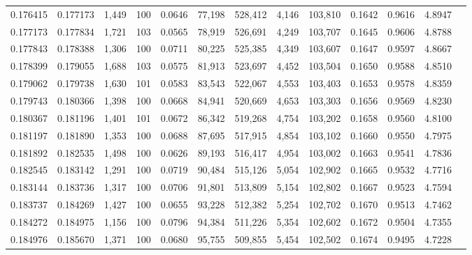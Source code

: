 \begin{tabular}{rrrrrrrrrrrrr}
0.176415 & 0.177173 & 1,449 & 100 &                                     0.0646 &  77,198 & 528,412 &   4,146 & 103,810 & 0.1642 & 0.9616 & 4.8947 \\
0.177173 & 0.177834 & 1,721 & 103 &                                     0.0565 &  78,919 & 526,691 &   4,249 & 103,707 & 0.1645 & 0.9606 & 4.8788 \\
0.177843 & 0.178388 & 1,306 & 100 &                                     0.0711 &  80,225 & 525,385 &   4,349 & 103,607 & 0.1647 & 0.9597 & 4.8667 \\
0.178399 & 0.179055 & 1,688 & 103 &                                     0.0575 &  81,913 & 523,697 &   4,452 & 103,504 & 0.1650 & 0.9588 & 4.8510 \\
0.179062 & 0.179738 & 1,630 & 101 &                                     0.0583 &  83,543 & 522,067 &   4,553 & 103,403 & 0.1653 & 0.9578 & 4.8359 \\
0.179743 & 0.180366 & 1,398 & 100 &                                     0.0668 &  84,941 & 520,669 &   4,653 & 103,303 & 0.1656 & 0.9569 & 4.8230 \\
0.180367 & 0.181196 & 1,401 & 101 &                                     0.0672 &  86,342 & 519,268 &   4,754 & 103,202 & 0.1658 & 0.9560 & 4.8100 \\
0.181197 & 0.181890 & 1,353 & 100 &                                     0.0688 &  87,695 & 517,915 &   4,854 & 103,102 & 0.1660 & 0.9550 & 4.7975 \\
0.181892 & 0.182535 & 1,498 & 100 &                                     0.0626 &  89,193 & 516,417 &   4,954 & 103,002 & 0.1663 & 0.9541 & 4.7836 \\
0.182545 & 0.183142 & 1,291 & 100 &                                     0.0719 &  90,484 & 515,126 &   5,054 & 102,902 & 0.1665 & 0.9532 & 4.7716 \\
0.183144 & 0.183736 & 1,317 & 100 &                                     0.0706 &  91,801 & 513,809 &   5,154 & 102,802 & 0.1667 & 0.9523 & 4.7594 \\
0.183737 & 0.184269 & 1,427 & 100 &                                     0.0655 &  93,228 & 512,382 &   5,254 & 102,702 & 0.1670 & 0.9513 & 4.7462 \\
0.184272 & 0.184975 & 1,156 & 100 &                                     0.0796 &  94,384 & 511,226 &   5,354 & 102,602 & 0.1672 & 0.9504 & 4.7355 \\
0.184976 & 0.185670 & 1,371 & 100 &                                     0.0680 &  95,755 & 509,855 &   5,454 & 102,502 & 0.1674 & 0.9495 & 4.7228 \\

\end{tabular}
